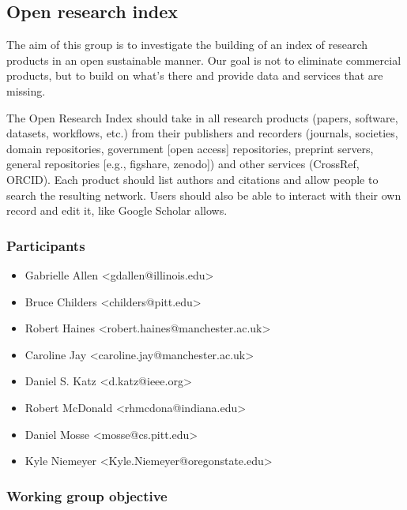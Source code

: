 \subsection{Open research index}
\label{sec:open-research-index}


The aim of this group is to investigate the building of an index of research products in an open sustainable manner.  Our goal is not to eliminate commercial products, but to build on what's there and provide data and services that are missing.

The Open Research Index should take in all research products (papers, software, datasets, workflows, etc.) from their publishers and recorders (journals, societies, domain repositories, government [open access] repositories, preprint servers, general repositories [e.g., figshare, zenodo]) and other services (CrossRef, ORCID).
Each product should list authors and citations and allow people to search the resulting network.
Users should also be able to interact with their own record and edit it, like Google Scholar allows.

\subsubsection{Participants}

\begin{itemize}
\item Gabrielle Allen <gdallen@illinois.edu>
\item Bruce Childers <childers@pitt.edu>
\item Robert Haines <robert.haines@manchester.ac.uk>
\item Caroline Jay <caroline.jay@manchester.ac.uk>
\item Daniel S. Katz <d.katz@ieee.org>
\item Robert McDonald <rhmcdona@indiana.edu>
\item Daniel Mosse <mosse@cs.pitt.edu>
\item Kyle Niemeyer <Kyle.Niemeyer@oregonstate.edu>
\end{itemize}

\subsubsection{Working group objective}

